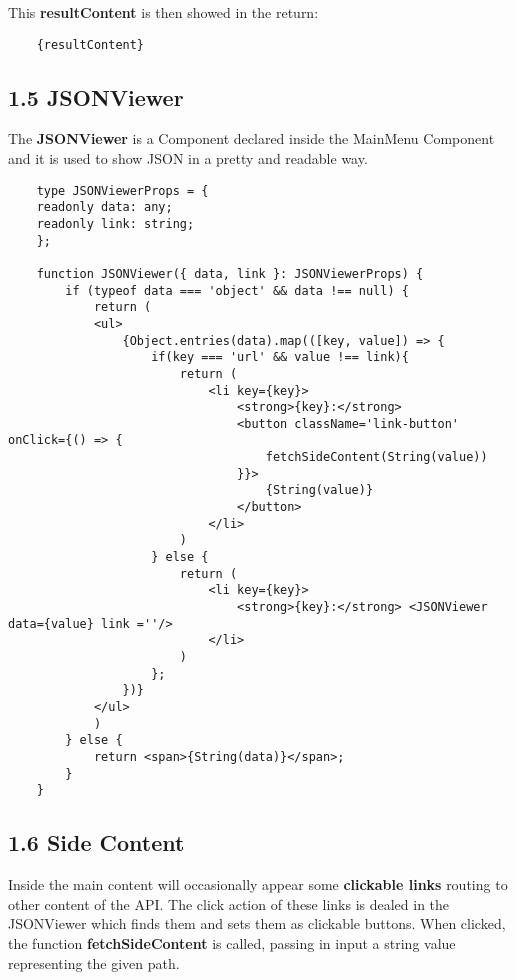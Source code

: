 \documentclass[
]{article}
\begin{document}
\begin{flushleft}
This \textbf{resultContent} is then showed in the return:

\begin{verbatim}
    {resultContent}
\end{verbatim}

\subsection{1.5 JSONViewer}\label{JSONViewer}

The \textbf{JSONViewer} is a Component declared inside the MainMenu Component and it is used to show JSON in a pretty and readable way.

\begin{verbatim}
    type JSONViewerProps = {
    readonly data: any;
    readonly link: string;
    };

    function JSONViewer({ data, link }: JSONViewerProps) {
        if (typeof data === 'object' && data !== null) {
            return (
            <ul>
                {Object.entries(data).map(([key, value]) => {
                    if(key === 'url' && value !== link){
                        return (
                            <li key={key}>
                                <strong>{key}:</strong>
                                <button className='link-button' onClick={() => {
                                    fetchSideContent(String(value))
                                }}>
                                    {String(value)}
                                </button>
                            </li>
                        )
                    } else {
                        return (
                            <li key={key}>
                                <strong>{key}:</strong> <JSONViewer data={value} link =''/>
                            </li>
                        )
                    };
                })}
            </ul>
            )
        } else {
            return <span>{String(data)}</span>;
        }
    }
\end{verbatim}

\subsection{1.6 Side Content}\label{sidecontent}

Inside the main content will occasionally appear some \textbf{clickable links} routing to other content of the API.
The click action of these links is dealed in the JSONViewer which finds them and sets them as clickable buttons.
When clicked, the function \textbf{fetchSideContent} is called, passing in input a string value representing the given path.


\end{flushleft}
\end{document}
